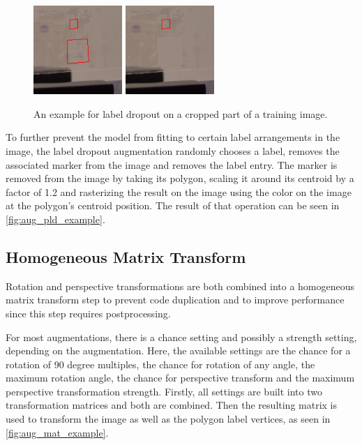 \documentclass[10pt]{book}
\newcommand{\figureref}[1]{\autoref{#1}}
\begin{document}
\begin{figure}
  \centering
     {\includegraphics[width=0.3\textwidth]{image/aug_pld_before}}
     {\includegraphics[width=0.3\textwidth]{image/aug_pld_after}}
  \caption{An example for label dropout on a cropped part of a training image.}
  \label{fig:aug_pld_example}
\end{figure}

To further prevent the model from fitting to certain label arrangements in the image, the label dropout augmentation randomly chooses a label, removes the associated marker from the image and removes the label entry. The marker is removed from the image by taking its polygon, scaling it around its centroid by a factor of 1.2 and rasterizing the result on the image using the color on the image at the polygon's centroid position. The result of that operation can be seen in \figureref{fig:aug_pld_example}.

\subsection{Homogeneous Matrix Transform}

Rotation and perspective transformations are both combined into a homogeneous matrix transform step to prevent code duplication and to improve performance since this step requires postprocessing.

For most augmentations, there is a chance setting and possibly a strength setting, depending on the augmentation. Here, the available settings are the chance for a rotation of 90 degree multiples, the chance for rotation of any angle, the maximum rotation angle, the chance for perspective transform and the maximum perspective transformation strength. Firstly, all settings are built into two transformation matrices and both are combined. Then the resulting matrix is used to transform the image as well as the polygon label vertices, as seen in \figureref{fig:aug_mat_example}.
\end{document}
